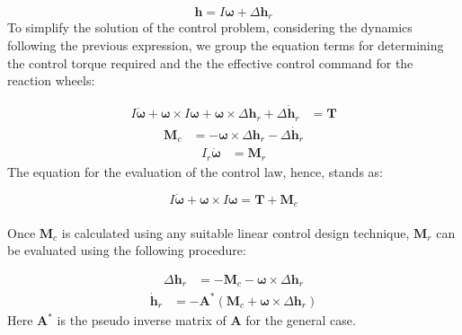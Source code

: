     \begin{equation*}
		\mathbf{h} = I \boldsymbol{\omega} + \Delta \mathbf{h}_r
    \end{equation*}	
To simplify the solution of the control problem, considering the dynamics following the previous expression, we group the equation terms for determining the control torque required and the the effective control command for the reaction wheels:

	\begin{align*}
	I \dot{\boldsymbol{\omega}} + \boldsymbol{\omega} \times I \boldsymbol{\omega} + \boldsymbol{\omega} \times \Delta \mathbf{h}_r + \Delta \dot{\mathbf{h}}_r &= \mathbf{T} 
	\end{align*}
	\begin{align*}
		\mathbf{M}_c &= -\boldsymbol{\omega} \times \Delta \mathbf{h}_r - \Delta \dot{\mathbf{h}}_r
	\end{align*}
	\begin{align*}
			I_r \dot{\boldsymbol{\omega}} &= \mathbf{M}_r 
	\end{align*}
The equation for the evaluation of the control law, hence, stands as:
	
	\begin{equation*}
		I \dot{\boldsymbol{\omega}} + \boldsymbol{\omega} \times I \boldsymbol{\omega} = \mathbf{T} + \mathbf{M}_c
	\end{equation*}\\
Once \( \mathbf{M}_c \) is calculated using any suitable linear control design technique,  \( \mathbf{M}_r \) can be evaluated using the following procedure:
	
	\begin{align*}
		\Delta \mathbf{h}_r &= -\mathbf{M}_c - \boldsymbol{\omega} \times \Delta \mathbf{h}_r 
	\end{align*}
	\begin{align*}
	\dot{\mathbf{h}}_r &= -\mathbf{A}^* ( \mathbf{M}_c + \boldsymbol{\omega} \times \Delta \mathbf{h}_r )
    \end{align*}
Here \( \mathbf{A}^* \) is the pseudo inverse matrix of \( \mathbf{A} \) for the general case.